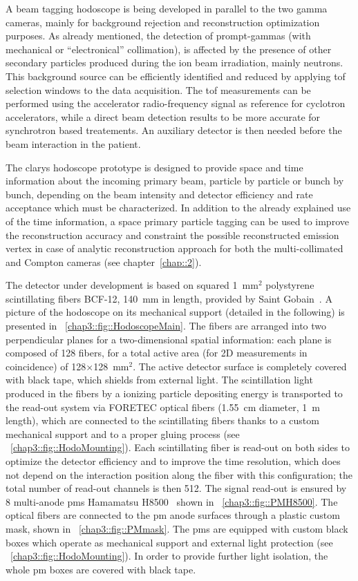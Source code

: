 A beam tagging hodoscope is being developed in parallel to the two gamma cameras, mainly for background rejection and reconstruction optimization purposes. As already mentioned, the detection of prompt-gammas (with mechanical or \enquote{electronical} collimation), is affected by the presence of other secondary particles produced during the ion beam irradiation, mainly neutrons. This background source can be efficiently identified and reduced by applying \gls{tof} selection windows to the data acquisition. The \gls{tof} measurements can be performed using the accelerator radio-frequency signal as reference for cyclotron accelerators, while a direct beam detection results to be more accurate for synchrotron based treatements. An auxiliary detector is then needed before the beam interaction in the patient.

The \gls{clarys} hodoscope prototype is designed to provide space and time information about the incoming primary beam, particle by particle or bunch by bunch, depending on the beam intensity and detector efficiency and rate acceptance which must be characterized. In addition to the already explained use of the time information, a space primary particle tagging can be used to improve the reconstruction accuracy and constraint the possible reconstructed emission vertex in case of analytic reconstruction approach for both the multi-collimated and Compton cameras (see chapter~\ref{chap::2}).
 
The detector under development is based on squared 1~mm$^{2}$ polystyrene scintillating fibers BCF-12, 140~mm in length, provided by Saint Gobain~\parencite{SaintGobain2017}. A picture of the hodoscope on its mechanical support (detailed in the following) is presented in \figurename~\ref{chap3::fig::HodoscopeMain}. The fibers are arranged into two perpendicular planes for a two-dimensional spatial information: each plane is composed of 128 fibers, for a total active area (for 2D measurements in coincidence) of 128$\times$128~mm$^{2}$. The active detector surface is completely covered with black tape, which shields from external light. The scintillation light produced in the fibers by a ionizing particle depositing energy is transported to the read-out system via FORETEC optical fibers (1.55~cm diameter, 1~m length), which are connected to the scintillating fibers thanks to a custom mechanical support and to a proper gluing process (see \figurename~\ref{chap3::fig::HodoMounting}). Each scintillating fiber is read-out on both sides to optimize the detector efficiency and to improve the time resolution, which does not depend on the interaction position along the fiber with this configuration; the total number of read-out channels is then 512. The signal read-out is ensured by 8 multi-anode \glspl{pm} Hamamatsu H8500~\parencite{Hamamatsu2006} shown in \figurename~\ref{chap3::fig::PMH8500}. The optical fibers are connected to the \gls{pm} anode surfaces through a plastic custom mask, shown in \figurename~\ref{chap3::fig::PMmask}. The \glspl{pm} are equipped with custom black boxes which operate as mechanical support and external light protection (see \figurename~\ref{chap3::fig::HodoMounting}). In order to provide further light isolation, the whole \gls{pm} boxes are covered with black tape.

